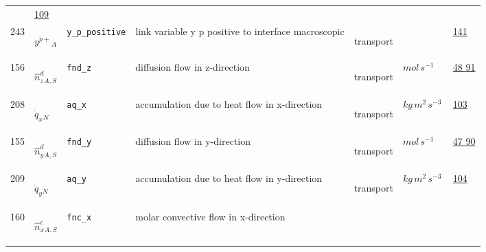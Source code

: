 \begin{longtable}{|p{1cm}|p{2.5cm}|p{4.5cm}|p{8cm}|p{3.0cm}|p{3cm}|p{1cm}|}
             &                 \hyperlink{"e:109"}{ 109 }
                 \\
            243
             & \hypertarget{"v:243"}{ $ {{y^{p+}}}{_{A}} $}
             & \verb|y_p_positive|
             & link variable  y p positive to interface macroscopic
             & \begin{lay}transport \end{lay}
             & $  $
             &                 \hyperlink{"e:141"}{ 141 }
                 \\
            156
             & \hypertarget{"v:156"}{ $ {{\hat{n}^{d}_z}}{_{A, S}} $}
             & \verb|fnd_z|
             & diffusion flow in z-direction
             & \begin{lay}transport \end{lay}
             & $ mol \,s^{-1} \, $
             &                 \hyperlink{"e:48"}{ 48 }
                                 \hyperlink{"e:91"}{ 91 }
                 \\
            208
             & \hypertarget{"v:208"}{ $ {{\dot{q}_x}}{_{N}} $}
             & \verb|aq_x|
             & accumulation due to heat flow in x-direction
             & \begin{lay}transport \end{lay}
             & $ kg \,m^{2} \,s^{-3} \, $
             &                 \hyperlink{"e:103"}{ 103 }
                 \\
            155
             & \hypertarget{"v:155"}{ $ {{\hat{n}^{d}_y}}{_{A, S}} $}
             & \verb|fnd_y|
             & diffusion flow in y-direction
             & \begin{lay}transport \end{lay}
             & $ mol \,s^{-1} \, $
             &                 \hyperlink{"e:47"}{ 47 }
                                 \hyperlink{"e:90"}{ 90 }
                 \\
            209
             & \hypertarget{"v:209"}{ $ {{\dot{q}_y}}{_{N}} $}
             & \verb|aq_y|
             & accumulation due to heat flow in y-direction
             & \begin{lay}transport \end{lay}
             & $ kg \,m^{2} \,s^{-3} \, $
             &                 \hyperlink{"e:104"}{ 104 }
                 \\
            160
             & \hypertarget{"v:160"}{ $ {{\hat{n}^c_x}}{_{A, S}} $}
             & \verb|fnc_x|
             & molar convective flow in x-direction

\end{longtable}
